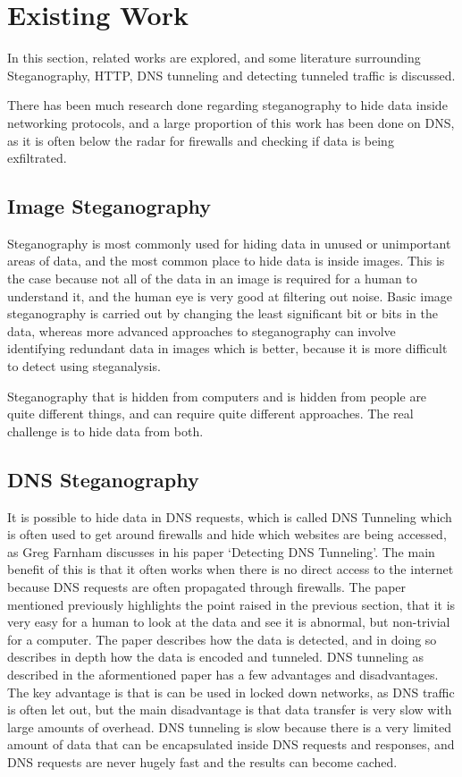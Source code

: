 \section{Existing Work}
In this section, related works are explored, and some literature surrounding Steganography, HTTP, DNS tunneling and detecting tunneled traffic is discussed.

There has been much research done regarding steganography to hide data inside networking protocols, and a large proportion of this work has been done on DNS, as it is often below the radar for firewalls and checking if data is being exfiltrated.
\subsection{Image Steganography}
Steganography is most commonly used for hiding data in unused or unimportant areas of data\cite{exploringsteno}, and the most common place to hide data is inside images. This is the case because not all of the data in an image is required for a human to understand it, and the human eye is very good at filtering out noise.
Basic image steganography is carried out by changing the least significant bit or bits in the data, whereas more advanced approaches to steganography can involve identifying redundant data in images\cite{introsteno} which is better, because it is more difficult to detect using steganalysis.

Steganography that is hidden from computers and is hidden from people are quite different things, and can require quite different approaches. The real challenge is to hide data from both.

\subsection{DNS Steganography}
It is possible to hide data in DNS requests, which is called DNS Tunneling which is often used to get around firewalls and hide which websites are being accessed, as Greg Farnham discusses in his paper `Detecting DNS Tunneling'\cite{detectingdns}. The main benefit of this is that it often works when there is no direct access to the internet because DNS requests are often propagated through firewalls.
The paper mentioned previously highlights the point raised in the previous section, that it is very easy for a human to look at the data and see it is abnormal, but non-trivial for a computer.
The paper describes how the data is detected, and in doing so describes in depth how the data is encoded and tunneled.
DNS tunneling as described in the aformentioned paper has a few advantages and disadvantages.
The key advantage is that is can be used in locked down networks, as DNS traffic is often let out, but the main disadvantage is that data transfer is very slow with large amounts of overhead.
DNS tunneling is slow because there is a very limited amount of data that can be encapsulated inside DNS requests and responses, and DNS requests are never hugely fast and the results can become cached.

